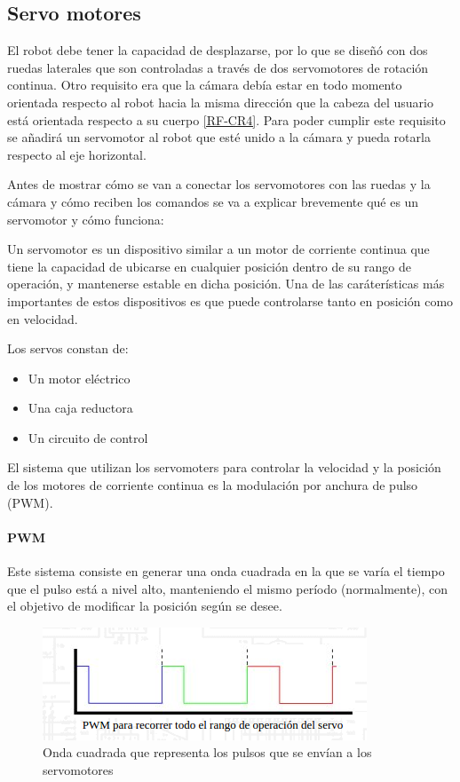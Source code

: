 \documentclass[twoside, 11pt]{epstfg}
\begin{document}
\subsection{Servo motores}
El robot debe tener la capacidad de desplazarse, por lo que se diseñó con dos ruedas laterales que son controladas a través de dos servomotores de rotación continua. Otro requisito era que la cámara debía estar en todo momento orientada respecto al robot hacia la misma dirección que la cabeza del usuario está orientada respecto a su cuerpo \ref{RF-CR4}. Para poder cumplir este requisito se añadirá un servomotor al robot que esté unido a la cámara y pueda rotarla respecto al eje horizontal.

Antes de mostrar cómo se van a conectar los servomotores con las ruedas y la cámara y cómo reciben los comandos se va a explicar brevemente qué es un servomotor y cómo funciona:

Un servomotor es un dispositivo similar a un motor de corriente continua que tiene la capacidad de ubicarse en cualquier posición dentro de su rango de operación, y mantenerse estable en dicha posición. Una de las caráterísticas más importantes de estos dispositivos es que puede controlarse tanto en posición como en velocidad.


Los servos constan de:
\begin{itemize}
	\item Un motor eléctrico
	\item Una caja reductora
	\item Un circuito de control
\end{itemize}

El sistema que utilizan los servomoters para controlar la velocidad y la posición de los motores de corriente continua es la modulación por anchura de pulso (PWM).

\paragraph{PWM}

Este sistema consiste en generar una onda cuadrada en la que se varía el tiempo que el pulso está a nivel alto, manteniendo el mismo período (normalmente), con el objetivo de modificar la posición según se desee.

\begin{figure}[h]
	\centerline{
		\mbox{\includegraphics[width=.80\textwidth]{images/ondaServo.png}}
	}
	\caption{Onda cuadrada que representa los pulsos que se envían a los servomotores}
	\label{ondaservo}
\end{figure}
\end{document}
